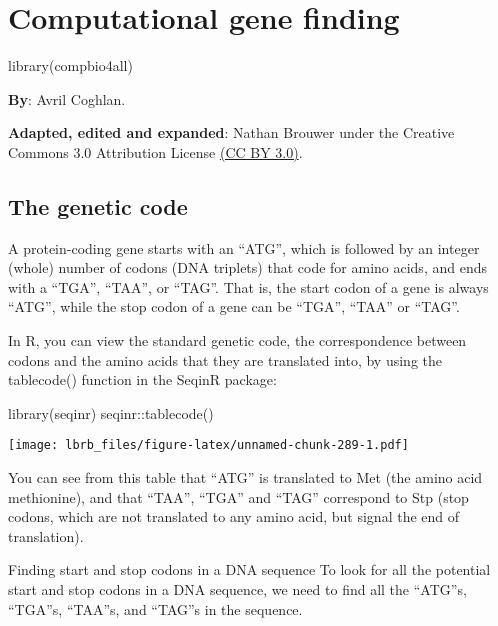 \documentclass[
]{book}
\newenvironment{Shaded}{\begin{snugshade}}{\end{snugshade}}
\newcommand{\FunctionTok}[1]{\textcolor[rgb]{0.00,0.00,0.00}{#1}}
\newcommand{\NormalTok}[1]{#1}
\newcommand{\SpecialCharTok}[1]{\textcolor[rgb]{0.00,0.00,0.00}{#1}}
\begin{document}
\hypertarget{computational-gene-finding}{%
\chapter{Computational gene finding}\label{computational-gene-finding}}

\begin{Shaded}
\begin{Highlighting}[]
\FunctionTok{library}\NormalTok{(compbio4all)}
\end{Highlighting}
\end{Shaded}

\textbf{By}: Avril Coghlan.

\textbf{Adapted, edited and expanded}: Nathan Brouwer under the Creative Commons 3.0 Attribution License \href{https://creativecommons.org/licenses/by/3.0/}{(CC BY 3.0)}.

\hypertarget{the-genetic-code}{%
\section{The genetic code}\label{the-genetic-code}}

A protein-coding gene starts with an ``ATG'', which is followed by an integer (whole) number of codons (DNA triplets) that code for amino acids, and ends with a ``TGA'', ``TAA'', or ``TAG''. That is, the start codon of a gene is always ``ATG'', while the stop codon of a gene can be ``TGA'', ``TAA'' or ``TAG''.

In R, you can view the standard genetic code, the correspondence between codons and the amino acids that they are translated into, by using the tablecode() function in the SeqinR package:

\begin{Shaded}
\begin{Highlighting}[]
\FunctionTok{library}\NormalTok{(seqinr)}
\NormalTok{seqinr}\SpecialCharTok{::}\FunctionTok{tablecode}\NormalTok{()}
\end{Highlighting}
\end{Shaded}

\texttt{[image: lbrb\_files/figure-latex/unnamed-chunk-289-1.pdf]}

You can see from this table that ``ATG'' is translated to Met (the amino acid methionine), and that ``TAA'', ``TGA'' and ``TAG'' correspond to Stp (stop codons, which are not translated to any amino acid, but signal the end of translation).

Finding start and stop codons in a DNA sequence
To look for all the potential start and stop codons in a DNA sequence, we need to find all the ``ATG''s, ``TGA''s, ``TAA''s, and ``TAG''s in the sequence.
\end{document}
